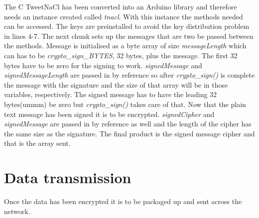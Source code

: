 The C TweetNaCl has been converted into an Arduino library and therefore needs an instance created called \emph{tnacl}. With this instance the methods needed can be accessed. The keys are preinstalled to avoid the key distribution problem in lines 4-7. The next chunk sets up the messages that are two be passed between the methods. Message is initialised as a byte array of size \emph{messageLength} which can has to be \emph{crypto\_sign\_BYTES}, 32 bytes, plus the message. The first 32 bytes have to be zero for the signing to work. \emph{signedMessage} and \emph{signedMessageLength} are passed in by reference so after \emph{crypto\_sign()} is complete the message with the signature and the size of that array will be in those variables, respectively. The signed message has to have the leading 32 bytes(ummm) be zero but \emph{crypto\_sign()} takes care of that. Now that the plain text message has been signed it is to be encrypted. \emph{signedCipher} and \emph{signedMessage} are passed in by reference as well and the length of the cipher has the same size as the signature. The final product is the signed message cipher and that is the array sent.

\section{Data transmission}
Once the data has been encrypted it is to be packaged up and sent across the network.

